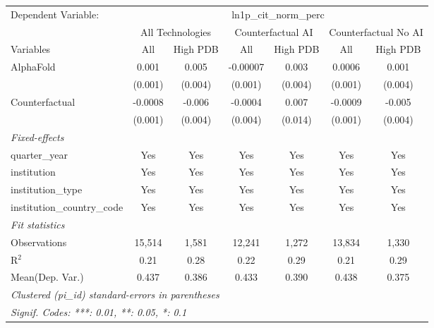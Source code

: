 \begingroup
\centering
\begin{tabular}{lcccccc}
   \tabularnewline \midrule \midrule
   Dependent Variable: & \multicolumn{6}{c}{ln1p\_cit\_norm\_perc}\\
 & \multicolumn{2}{c}{All Technologies} & \multicolumn{2}{c}{Counterfactual AI} & \multicolumn{2}{c}{Counterfactual No AI} \\
\cmidrule(lr){1-1}\cmidrule(lr){2-3} \cmidrule(lr){4-5} \cmidrule(lr){6-7}
Variables & \multicolumn{1}{c}{All} & \multicolumn{1}{c}{High PDB} & \multicolumn{1}{c}{All} & \multicolumn{1}{c}{High PDB} & \multicolumn{1}{c}{All} & \multicolumn{1}{c}{High PDB} \\
\cmidrule(lr){1-1}\cmidrule(lr){2-2} \cmidrule(lr){3-3} \cmidrule(lr){4-4} \cmidrule(lr){5-5} \cmidrule(lr){6-6} \cmidrule(lr){7-7}
   AlphaFold                    & 0.001   & 0.005   & -0.00007 & 0.003   & 0.0006  & 0.001\\   
                                & (0.001) & (0.004) & (0.001)  & (0.004) & (0.001) & (0.004)\\   
   Counterfactual               & -0.0008 & -0.006  & -0.0004  & 0.007   & -0.0009 & -0.005\\   
                                & (0.001) & (0.004) & (0.004)  & (0.014) & (0.001) & (0.004)\\   
   \midrule
   \emph{Fixed-effects}\\
   quarter\_year                & Yes     & Yes     & Yes      & Yes     & Yes     & Yes\\  
   institution                  & Yes     & Yes     & Yes      & Yes     & Yes     & Yes\\  
   institution\_type            & Yes     & Yes     & Yes      & Yes     & Yes     & Yes\\  
   institution\_country\_code   & Yes     & Yes     & Yes      & Yes     & Yes     & Yes\\  
   \midrule
   \emph{Fit statistics}\\
   Observations                 & 15,514  & 1,581   & 12,241   & 1,272   & 13,834  & 1,330\\  
   R$^2$                        & 0.21    & 0.28    & 0.22     & 0.29    & 0.21    & 0.29\\  
Mean(Dep. Var.) & 0.437 & 0.386 & 0.433 & 0.390 & 0.438 & 0.375 \\
   \midrule \midrule
   \multicolumn{7}{l}{\emph{Clustered (pi\_id) standard-errors in parentheses}}\\
   \multicolumn{7}{l}{\emph{Signif. Codes: ***: 0.01, **: 0.05, *: 0.1}}\\
\end{tabular}
\par\endgroup

